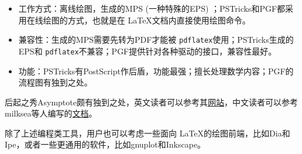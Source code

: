\begin{itemize}
\item 工作方式：\MP 离线绘图，生成的MPS (一种特殊的EPS) ；PSTricks和PGF都采用在线绘图的方式，也就是在 \LaTeX 文档内直接使用绘图命令。
\item 兼容性：\MP 生成的MPS需要先转为PDF才能被 \texttt{pdflatex}使用；PSTricks生成的EPS和 \texttt{pdflatex}不兼容；PGF提供针对各种驱动的接口，兼容性最好。
\item 功能：PSTricks有PostScript作后盾，功能最强；\MP{}擅长处理数学内容；PGF的流程图有独到之处。
\end{itemize}

后起之秀Asymptote颇有独到之处，英文读者可以参考其\href{http://asymptote.sourceforge.net/}{网站}，中文读者可以参考milksea等人编写的\href{http://bbs.ctex.org/viewthread.php?tid=47893&extra=page%3D1}{文档}。

除了上述编程类工具，用户也可以考虑一些面向 \LaTeX 的绘图前端，比如Dia和Ipe，或者一些更通用的软件，比如gnuplot和Inkscape。



